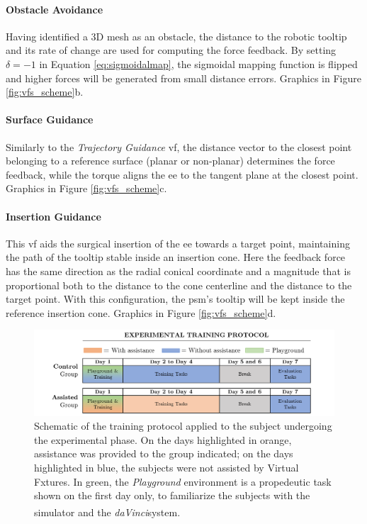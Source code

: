 \documentclass{article}
\newcommand{\cright}{\textsuperscript{\textregistered}\phantom{..}}
\begin{document}
\begin{multicols}{2}
\paragraph{Obstacle Avoidance} Having identified a 3D mesh as an obstacle, the distance to the robotic tooltip and its rate of change are used for computing the force feedback. By setting $\delta = -1$ in Equation \ref{eq:sigmoidalmap}, the sigmoidal mapping function is flipped and higher forces will be generated from small distance errors.  Graphics in Figure \ref{fig:vfs_scheme}b.
\paragraph{Surface Guidance} Similarly to the \textit{Trajectory Guidance} \ac{vf}, the distance vector to the closest point belonging to a reference surface (planar or non-planar) determines the force feedback, while the torque aligns the \ac{ee} to the tangent plane at the closest point. Graphics in Figure \ref{fig:vfs_scheme}c.
\paragraph{Insertion Guidance} This \ac{vf} aids the surgical insertion of the \ac{ee} towards a target point, maintaining the path of the tooltip stable inside an insertion cone. Here the feedback force has the same direction as the radial conical coordinate and a magnitude that is proportional both to the distance to the cone centerline and the distance to the target point. With this configuration, the \ac{psm}'s tooltip will be kept inside the reference insertion cone. Graphics in Figure \ref{fig:vfs_scheme}d.

\begin{figure}
  \centering
      \includegraphics[width=\linewidth]{images/training_protocol.png}
      \caption{Schematic of the training protocol applied to the subject undergoing the experimental phase. On the days highlighted in orange,  assistance was provided to the group indicated; on the days highlighted in blue, the subjects were not assisted by Virtual Fxtures. In green, the \textit{Playground} environment is a propedeutic task shown on the first day only, to familiarize the subjects with the simulator and the \textit{daVinci}\cright system.}
      \label{fig:training_protocol} 
\end{figure}


\end{multicols}
\end{document}
